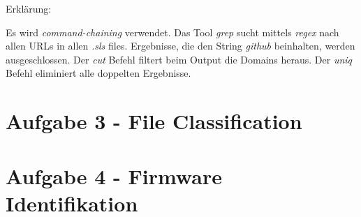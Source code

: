 Erklärung:

Es wird \textit{command-chaining} verwendet.
Das Tool \textit{grep} sucht mittels \textit{regex} nach allen URLs in allen \textit{.sls} files.
Ergebnisse, die den String \textit{github} beinhalten, werden ausgeschlossen.
Der \textit{cut} Befehl filtert beim Output die Domains heraus.
Der \textit{uniq} Befehl eliminiert alle doppelten Ergebnisse.

\section*{Aufgabe 3 - File Classification}



\section*{Aufgabe 4 - Firmware Identifikation}



